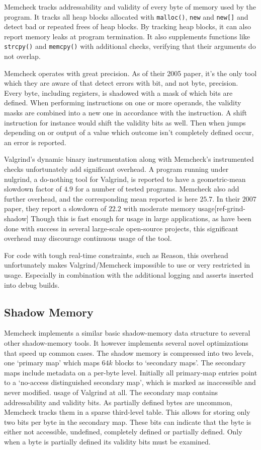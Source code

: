 Memcheck tracks addressability and validity of every byte of memory used by the
program.
It tracks all heap blocks allocated with \texttt{malloc()}, \texttt{new} and 
\texttt{new[]} and detect bad or repeated frees of heap blocks.
By tracking heap blocks, it can also report memory leaks at program termination.
It also supplements functions like \texttt{strcpy()} and \texttt{memcpy()} with
additional checks, verifying that their arguments do not overlap.

Memcheck operates with great precision.
As of their 2005 paper, it's the only tool which they are aware of that detect
errors with bit, and not byte, precision.
Every byte, including registers, is shadowed with a mask of which bits are
defined.
When performing instructions on one or more operands, the validity masks are
combined into a new one in accordance with the instruction.
A shift instruction for instance would shift the validity bits as well.
Then when jumps depending on or output of a value which outcome isn't completely
defined occur, an error is reported.

Valgrind's dynamic binary instrumentation along with Memcheck's instrumented
checks unfortunately add significant overhead.
A program running under nulgrind, a do-nothing tool for Valgrind, is reported
to have a geometric-mean slowdown factor of $4.9$ for a number of tested
programs.
Memcheck also add further overhead, and the corresponding mean reported is here
$25.7$.
In their $2007$ paper, they report a slowdown of $22.2$ with moderate memory
usage[ref-grind-shadow]
Though this is fast enough for usage in large applications, as have been done
with success in several large-scale open-source projects, this significant
overhead may discourage continuous usage of the tool.

For code with tough real-time constraints, such as Reason, this overhead
unfortunately makes Valgrind/Memcheck impossible to use or very restricted in
usage.
Especially in combination with the additional logging and asserts inserted into
debug builds.

\subsection {Shadow Memory}

Memcheck implements a similar basic shadow-memory data structure to several
other shadow-memory tools.
It however implements several novel optimizations that speed up common cases.
The shadow memory is compressed into two levels, one `primary map' which maps
$64k$ blocks to `secondary maps'.
The secondary maps include metadata on a per-byte level.
Initially all primary-map entries point to a `no-access distinguished secondary
map', which is marked as inaccessible and never modified.
usage of Valgrind at all.
The secondary map contains addressability and validity bits.
As partially defined bytes are uncommon, Memcheck tracks them in a sparse
third-level table.
This allows for storing only two bits per byte in the secondary map.
These bits can indicate that the byte is either not accessible, undefined,
completely defined or partially defined.
Only when a byte is partially defined its validity bits must be examined.




